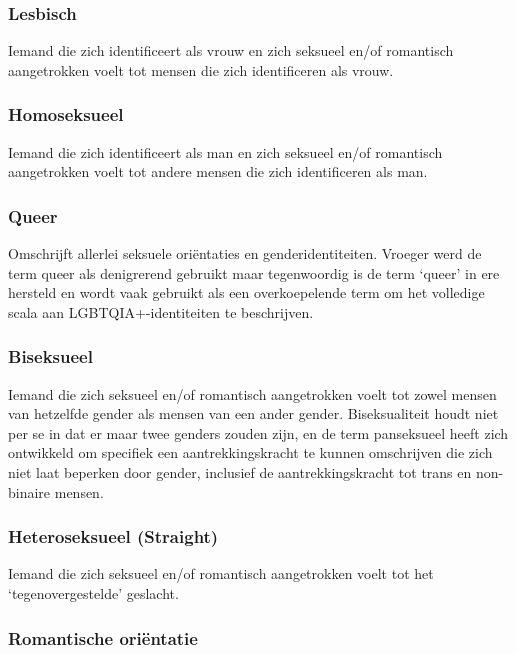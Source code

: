 \documentclass[12pt,openany]{book}
\begin{document}
\subsubsection*{Lesbisch}

Iemand die zich identificeert als vrouw en zich seksueel en/of romantisch aangetrokken voelt tot mensen die zich identificeren als vrouw.

\subsubsection*{Homoseksueel}

Iemand die zich identificeert als man en zich seksueel en/of romantisch aangetrokken voelt tot andere mensen die zich identificeren als man.

\subsubsection*{Queer}

Omschrijft allerlei seksuele oriëntaties en genderidentiteiten. Vroeger werd de term queer als denigrerend gebruikt maar tegenwoordig is de term ‘queer’ in ere hersteld en wordt vaak gebruikt als een overkoepelende term om het volledige scala aan LGBTQIA+-identiteiten te beschrijven.  

\subsubsection*{Biseksueel}

Iemand die zich seksueel en/of romantisch aangetrokken voelt tot zowel mensen van hetzelfde gender als mensen van een ander gender. Biseksualiteit houdt niet per se in dat er maar twee genders zouden zijn, en de term panseksueel heeft zich ontwikkeld om specifiek een aantrekkingskracht te kunnen omschrijven die zich niet laat beperken door gender, inclusief de aantrekkingskracht tot trans en non-binaire mensen.

\subsubsection*{Heteroseksueel (Straight)}

Iemand die zich seksueel en/of romantisch aangetrokken voelt tot het ‘tegenovergestelde’ geslacht.

\subsubsection*{Romantische oriëntatie}
\end{document}
